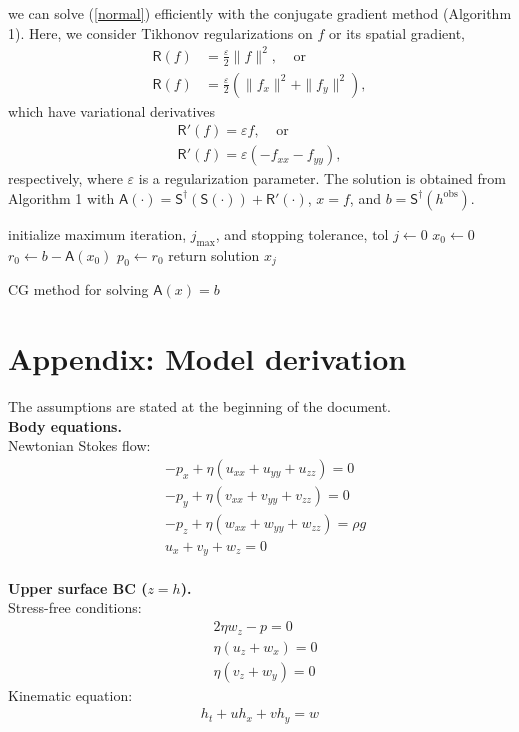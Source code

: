 \documentclass[paper=a4, fontsize=11pt]{article}
\begin{document}
we can solve (\ref{normal})
efficiently with the conjugate gradient method (Algorithm 1).
Here, we consider Tikhonov regularizations on $f$ or its spatial gradient,
\begin{align}
\mathsf{R}(f)&=\frac{\varepsilon}{2}\|f\|^2,\;\;\;\; \text{or}\\
\mathsf{R}(f)&=\frac{\varepsilon}{2}(\|f_x\|^2+\|f_y\|^2),
\end{align}
which have variational derivatives
\begin{align}
\mathsf{R}'(f) = \varepsilon f, \;\;\;\; \text{or} \\
\mathsf{R}'(f) = \varepsilon (-f_{xx}-f_{yy}),
\end{align}
respectively, where $\varepsilon$ is a regularization parameter.
The solution is obtained from Algorithm 1 with $\mathsf{A}(\cdot) = \mathsf{S}^\dagger(\mathsf{S}(\cdot)) + \mathsf{R}'(\cdot) $, $x=f$, and $b=\mathsf{S}^\dagger (h^{\mathrm{obs}})$.

\begin{algorithm}[H]
\SetAlgoLined
initialize maximum iteration, $j_\mathrm{max}$, and stopping tolerance, $\mathrm{tol}$\;
 $j \gets 0$\;
 $x_0 \gets 0$\;
 ${r_0} \gets b - \mathsf{A}(x_0)$\;
 $p_0 \gets r_0$\;
 return solution $x_j$\;
 \caption{CG method for solving $\mathsf{A}(x)=b$ }
\end{algorithm}


\newpage

\section*{Appendix: Model derivation}
The assumptions are stated at the beginning of the document.\\
\noindent\textbf{Body equations.}\\
Newtonian Stokes flow:
\begin{align}
&-p_x + \eta ( u_{xx} +u_{yy} + u_{zz}) = 0  \\
&-p_y + \eta ( v_{xx}+v_{yy} + v_{zz}) = 0 \\
&-p_z + \eta ( w_{xx} +w_{yy} + w_{zz}) = \rho g \\
&u_x + v_y + w_z = 0
\end{align}
\\
\noindent\textbf{Upper surface BC ($z=h$).}\\
Stress-free conditions:
\begin{align}
&2\eta w_z - p = 0 \\
&\eta(u_z +w_x) = 0 \\
&\eta(v_z +w_y) = 0
\end{align}
Kinematic equation:
\begin{align}
h_t + uh_x + vh_y = w
\end{align}
\end{document}
